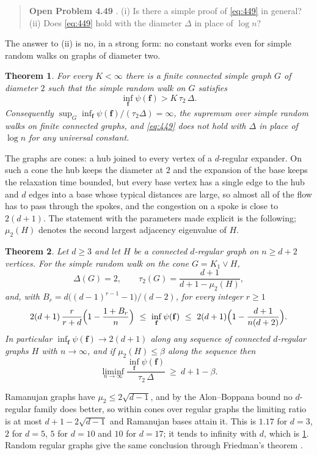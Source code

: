 \documentclass[11pt]{amsart}
\newtheorem{theorem}{Theorem}[section]
\theoremstyle{definition}
\newcommand{\bfF}{\mathbf{f}}
\begin{document}
\begin{quote}
\textbf{Open Problem 4.49} \cite{AF}. (i) Is there a simple proof of \eqref{eq:449} in general? (ii) Does \eqref{eq:449} hold with the diameter $\Delta$ in place of $\log n$?
\end{quote}

The answer to (ii) is no, in a strong form: no constant works even for simple random walks on graphs of diameter two.

\begin{theorem}\label{thm:main}
For every $K<\infty$ there is a finite connected simple graph $G$ of diameter $2$ such that the simple random walk on $G$ satisfies
\[
\inf_{\bfF}\psi(\bfF)>K\,\tau_2\,\Delta .
\]
Consequently $\sup_G\inf_{\bfF}\psi(\bfF)/(\tau_2\Delta)=\infty$, the supremum over simple random walks on finite connected graphs, and \eqref{eq:449} does not hold with $\Delta$ in place of $\log n$ for any universal constant.
\end{theorem}

The graphs are cones: a hub joined to every vertex of a $d$-regular expander. On such a cone the hub keeps the diameter at $2$ and the expansion of the base keeps the relaxation time bounded, but every base vertex has a single edge to the hub and $d$ edges into a base whose typical distances are large, so almost all of the flow has to pass through the spokes, and the congestion on a spoke is close to $2(d+1)$. The statement with the parameters made explicit is the following; $\mu_2(H)$ denotes the second largest adjacency eigenvalue of $H$.

\begin{theorem}\label{thm:cone}
Let $d\ge3$ and let $H$ be a connected $d$-regular graph on $n\ge d+2$ vertices. For the simple random walk on the cone $G=K_1\vee H$,
\[
\Delta(G)=2,\qquad \tau_2(G)=\frac{d+1}{d+1-\mu_2(H)},
\]
and, with $B_r=d\bigl((d-1)^{r-1}-1\bigr)/(d-2)$, for every integer $r\ge1$
\begin{equation}\label{eq:twosided}
2(d+1)\,\frac r{r+d}\Bigl(1-\frac{1+B_r}n\Bigr)\ \le\ \inf_{\bfF}\psi(\bfF)\ \le\ 2(d+1)\Bigl(1-\frac{d+1}{n(d+2)}\Bigr).
\end{equation}
In particular $\inf_{\bfF}\psi(\bfF)\to2(d+1)$ along any sequence of connected $d$-regular graphs $H$ with $n\to\infty$, and if $\mu_2(H)\le\beta$ along the sequence then
\[
\liminf_{n\to\infty}\frac{\inf_{\bfF}\psi(\bfF)}{\tau_2\,\Delta}\ \ge\ d+1-\beta .
\]
\end{theorem}

Ramanujan graphs \cite{LPS,Morgenstern} have $\mu_2\le2\sqrt{d-1}$, and by the Alon--Boppana bound \cite{Nilli} no $d$-regular family does better, so within cones over regular graphs the limiting ratio is at most $d+1-2\sqrt{d-1}$ and Ramanujan bases attain it. This is $1.17$ for $d=3$, $2$ for $d=5$, $5$ for $d=10$ and $10$ for $d=17$; it tends to infinity with $d$, which is \cref{thm:main}. Random regular graphs give the same conclusion through Friedman's theorem \cite{Friedman}.
\end{document}
